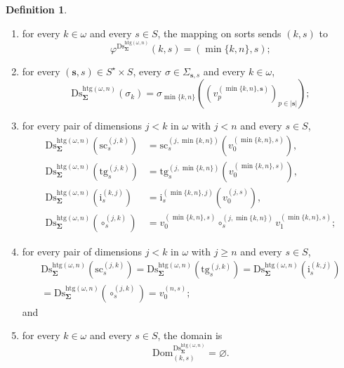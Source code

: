\documentclass[a4paper, reqno]{amsbook}
\newcommand{\bb}[1]{\ensuremath{\lvert #1 \rvert}}
\newcommand{\sig}[1]{\mathbf{#1}}             %
\newcommand{\Dom}{\mathrm{Dom}}
\newcommand{\htg}{\mathrm{htg}}                %
\newcommand{\src}{\mathrm{sc}}
\newcommand{\tgt}{\mathrm{tg}}
\newcommand{\Ds}{\mathrm{Ds}}
\theoremstyle{plain}
\theoremstyle{definition}
\newtheorem{definition}[theorem]{Definition}
\begin{document}
\begin{definition}
\begin{enumerate}
\begin{enumerate}
\item for every $k\in\omega$ and every $s\in S$, the mapping on sorts sends $(k,s)$ to
$$
\varphi^{\Ds^{\htg(\omega,n)}_{\sig{\Sigma}}}(k,s)=(\min\{k,n\},s);
$$
\item for every $(\mathbf{s},s)\in S^{\star}\times S$, every $\sigma\in\Sigma_{\mathbf{s},s}$ and every $k\in\omega$,
$$
\Ds^{\htg(\omega,n)}_{\sig{\Sigma}}(\sigma_{k})=\sigma_{\min\{k,n\}}\left(\left(v^{(\min\{k,n\},\mathbf{s})}_{p}\right)_{p\in\bb{\mathbf{s}}}\right);
$$
\item for every pair of dimensions $j<k$ in $\omega$ with $j<n$ and every $s\in S$,
\begin{align*}
\Ds^{\htg(\omega,n)}_{\sig{\Sigma}}(\src^{(j,k)}_{s})&=\src^{(j,\min\{k,n\})}_{s}\left(v^{(\min\{k,n\},s)}_{0}\right),\\
\Ds^{\htg(\omega,n)}_{\sig{\Sigma}}(\tgt^{(j,k)}_{s})&=\tgt^{(j,\min\{k,n\})}_{s}\left(v^{(\min\{k,n\},s)}_{0}\right),\\
\Ds^{\htg(\omega,n)}_{\sig{\Sigma}}(\mathrm{i}^{(k,j)}_{s})&=\mathrm{i}^{(\min\{k,n\},j)}_{s}\left(v^{(j,s)}_{0}\right),\\
\Ds^{\htg(\omega,n)}_{\sig{\Sigma}}(\circ^{(j,k)}_{s})&=v^{(\min\{k,n\},s)}_{0}\circ^{(j,\min\{k,n\})}_{s}v^{(\min\{k,n\},s)}_{1};
\end{align*}
\item for every pair of dimensions $j<k$ in $\omega$ with $j\geq n$ and every $s\in S$,
\begin{multline*}
\Ds^{\htg(\omega,n)}_{\sig{\Sigma}}(\src^{(j,k)}_{s})=
\Ds^{\htg(\omega,n)}_{\sig{\Sigma}}(\tgt^{(j,k)}_{s})=
\Ds^{\htg(\omega,n)}_{\sig{\Sigma}}(\mathrm{i}^{(k,j)}_{s})
\\=
\Ds^{\htg(\omega,n)}_{\sig{\Sigma}}(\circ^{(j,k)}_{s})=v^{(n,s)}_{0};
\end{multline*}
and
\item for every $k\in\omega$ and every $s\in S$, the domain is
$$
\Dom^{\Ds^{\htg(\omega,n)}_{\sig{\Sigma}}}_{(k,s)}=\varnothing.
$$
\end{enumerate}
\end{enumerate}
\end{definition}
\end{document}
